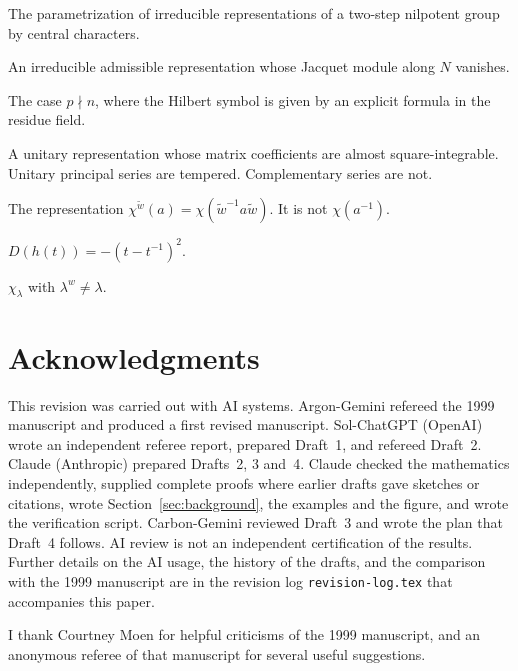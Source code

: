 \documentclass[12pt,letterpaper]{article}
\numberwithin{equation}{section}
\theoremstyle{plain}
\theoremstyle{definition}
\theoremstyle{remark}
\newcommand{\wt}{\tilde w}
\begin{document}
\begin{description}[leftmargin=3.5cm,style=nextline]
\item[Stone--von Neumann theorem] The parametrization of irreducible
  representations of a two-step nilpotent group by central characters.
\item[Supercuspidal] An irreducible admissible representation whose
  Jacquet module along $N$ vanishes.
\item[Tame] The case $p\nmid n$, where the Hilbert symbol is given by
  an explicit formula in the residue field.
\item[Tempered] A unitary representation whose matrix coefficients are
  almost square-integrable. Unitary principal series are tempered.
  Complementary series are not.
\item[Weyl conjugate] The representation
  $\chi^{\wt}(a)=\chi(\wt^{-1}a\wt)$. It is not $\chi(a^{-1})$.
\item[Weyl discriminant] $D(h(t))=-(t-t^{-1})^2$.
\item[Weyl regular] $\chi_\lambda$ with $\lambda^w\ne\lambda$.
\end{description}

\section*{Acknowledgments}

This revision was carried out with AI systems. Argon-Gemini refereed
the 1999 manuscript and produced a first revised manuscript.
Sol-ChatGPT (OpenAI) wrote an independent referee report, prepared
Draft~1, and refereed Draft~2. Claude (Anthropic) prepared Drafts~2, 3
and~4. Claude checked the mathematics independently, supplied complete
proofs where earlier drafts gave sketches or citations, wrote
Section~\ref{sec:background}, the examples and the figure, and wrote
the verification script. Carbon-Gemini reviewed Draft~3 and wrote the
plan that Draft~4 follows. AI review is not an independent
certification of the results. Further details on the AI usage, the
history of the drafts, and the comparison with the 1999 manuscript are
in the revision log \texttt{revision-log.tex} that accompanies this
paper.

I thank Courtney Moen for helpful criticisms of the 1999 manuscript,
and an anonymous referee of that manuscript for several useful
suggestions.
\end{document}
